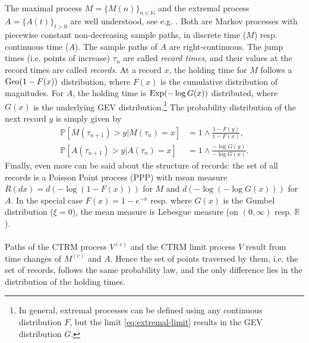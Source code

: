 \documentclass[12pt, a4paper]{article}
\newcommand{\PP}{\mathbb{P}}
\newcommand{\1}{\mathbf 1}
\begin{document}
\paragraph{}
The maximal process $M = \{M(n)\}_{n\in \mathbb N}$ 
and the extremal process $A = \{A(t)\}_{t > 0}$
are well understood, see e.g. \cite[Chapter 4]{resnick2013extreme}. 
Both are Markov processes with piecewise constant non-decreasing sample paths, 
in discrete time ($M$) resp. continuous time ($A$). 
The sample paths of $A$ are right-continuous. 
The jump times (i.e. points of increase) $\tau_n$ are called \emph{record times}, 
and their values at the record times are called \emph{records}. 
At a record $x$, the holding time for $M$ follows a ${\rm Geo}(1-F(x))$ distribution, 
where $F(x)$ is the cumulative distribution of magnitudes. 
For $A$, the holding time is ${\rm Exp}(-\log G(x))$ distributed, where $G(x)$
is the underlying GEV distribution.\footnote{In general, extremal processes can 
be defined using any continuous distribution $F$, but the limit 
\eqref{eq:extremal-limit} results in the GEV distribution $G$.}
The probability distribution of the next record $y$ is simply given by 
\begin{align} \label{eq:record-chain-1}
  \PP[M(\tau_{n+1}) > y | M(\tau_n) = x] &= 1 \wedge \frac{1-F(y)}{1-F(x)}, 
  \\
  \label{eq:record-chain-2}
  \PP[A(\tau_{n+1}) > y | A(\tau_n) = x] &= 1 \wedge \frac{-\log G(y)}{-\log G(x)}.
\end{align}
Finally, even more can be said about the structure of records: 
the set of all records is a Poisson Point process (PPP) with
mean measure $R(dx) = d(-\log (1-F(x)))$ for $M$ and 
$d(-\log (-\log G(x)))$ for $A$.
In the special case $F(x) = 1-e^{-x}$ resp. where $G(x)$ is the Gumbel distribution 
($\xi = 0$), the mean measure is Lebesgue measure (on $(0, \infty)$ resp. $\mathbb R$).


\paragraph{}
Paths of the CTRM process $V^{(c)}$ and the CTRM limit process $V$
result from time changes of $M^{(c)}$ and $A$. 
Hence the set of points traversed by them, i.e. the set of records, 
follows the same probability law, and the only difference lies in the 
distribution of the holding times. 
\end{document}
